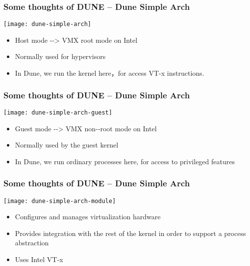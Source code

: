 \begin{frame}[plain]
	\frametitle{ Some thoughts of DUNE -- Dune Simple Arch}
	
	\centering
	
	
	\texttt{[image: dune-simple-arch]}
	\centering
	\begin{itemize}
		\item Host	
 mode	
 -­‐>	
 VMX	
 root	
 mode	
 on	
 Intel	
  
		
		\item Normally	 used	 for	 hypervisors	

		\item In Dune,	we	run	the	kernel	here，for access VT-x instructions.	 		
	\end{itemize}		
	
\end{frame}


\begin{frame}[plain]
	\frametitle{ Some thoughts of DUNE -- Dune Simple Arch}
	
	\centering
	
	
	\texttt{[image: dune-simple-arch-guest]}
	\centering
	\begin{itemize}
		\item Guest	
 mode	
 -­‐>	
 VMX	
 non-­‐root	
 mode	
 on	
 Intel	
  
			
  
		
		\item Normally	 used by	 the	 guest	 kernel	
		
		\item In Dune, we	
 run	
 ordinary	
 processes	
 here, for access	
 to	
 privileged	
 features		
	\end{itemize}		
	
\end{frame}


\begin{frame}[plain]
	\frametitle{ Some thoughts of DUNE -- Dune Simple Arch}
	
	\centering
	
	
	\texttt{[image: dune-simple-arch-module]}
	\centering
	\begin{itemize}
		\item Configures	 and manages	 virtualization	 hardware		
  		
		
		\item Provides	
 integration	
 with	
 the	
 rest	
 of	
 the	
 kernel	
 in	
 order	
 to	
 support	
 a	
  		process	
 abstraction
		
		\item Uses	 Intel VT‐x		
	\end{itemize}		
	
\end{frame}


